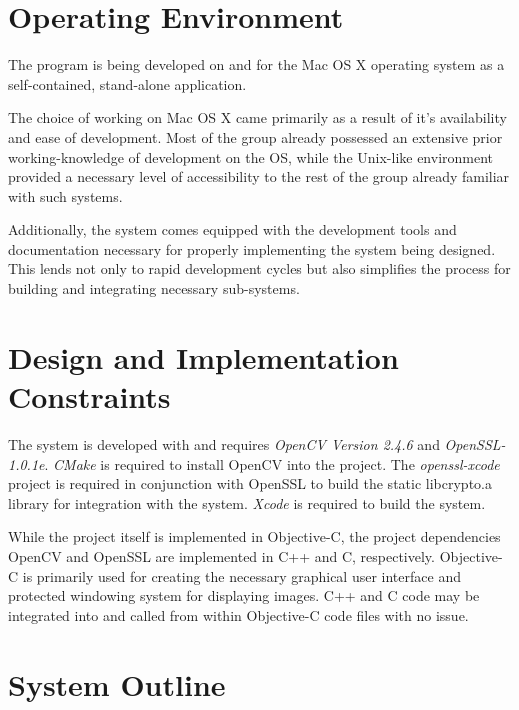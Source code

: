 \documentclass[11pt, a4paper,titlepage]{report}
\begin{document}
\section{Operating Environment}
The program is being developed on and for the Mac OS X operating system as a self-contained, stand-alone application.

The choice of working on Mac OS X came primarily as a result of it's availability and ease of development. Most of the group already possessed an extensive prior working-knowledge of development on the OS, while the Unix-like environment provided a necessary level of accessibility to the rest of the group already familiar with such systems.

Additionally, the system comes equipped with the development  tools and documentation necessary for properly implementing the system being designed. This lends not only to rapid development cycles but also simplifies the process for building and integrating necessary sub-systems.

\section{Design and Implementation Constraints}
The system is developed with and requires \emph{OpenCV Version 2.4.6} and \emph{OpenSSL-1.0.1e}. \emph{CMake} \cite{software:cmake} is required to install OpenCV into the project. The \emph{openssl-xcode} \cite{software:ssl-xcode} project is required in conjunction with OpenSSL to build the static libcrypto.a library for integration with the system. \emph{Xcode} is required to build the system.

While the project itself is implemented in Objective-C, the project dependencies OpenCV and OpenSSL are implemented in C++ and C, respectively. Objective-C is primarily used for creating the necessary graphical user interface and protected windowing system for displaying images. C++ and C code may be integrated into and called from within Objective-C code files with no issue.

\section{System Outline}
\end{document}

